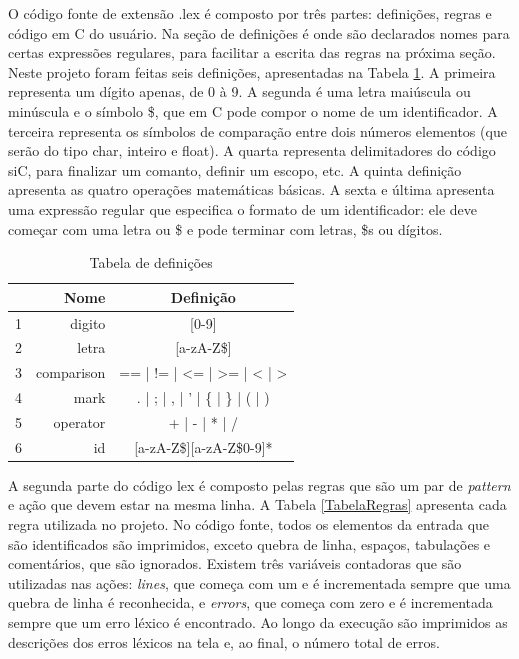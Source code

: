 \documentclass[12pt]{article}
\begin{document}
\indent O código fonte de extensão .lex é composto por três partes: definições, regras e código em C do usuário. Na seção de definições é onde são declarados nomes para certas expressões regulares, para facilitar a escrita das regras na próxima seção. Neste projeto foram feitas seis definições, apresentadas na Tabela \ref{TabelaDef}. A primeira representa um dígito apenas, de 0 à 9. A segunda é uma letra maiúscula ou minúscula e o símbolo \$, que em C pode compor o nome de um identificador. A terceira representa os símbolos de comparação entre dois números elementos (que serão do tipo char, inteiro e float). A quarta representa delimitadores do código siC, para finalizar um comanto, definir um escopo, etc. A quinta definição apresenta as quatro operações matemáticas básicas. A sexta e última apresenta uma expressão regular que especifica o formato de um identificador: ele deve começar com uma letra ou \$ e pode terminar com letras, \$s ou dígitos.

\begin{table}
 \centering
 \begin{tabular}{| c || r  c |}
  \hline
   & Nome & Definição \\
  \hline  \hline
  1 & digito & [0-9] \\
  \hline
  2 & letra & [a-zA-Z\$] \\
  \hline
  3 & comparison & == | != | <= | >= | < | > \\
  \hline
  4 & mark & . | ; | , | ' | \{ | \} | ( | ) \\
  \hline
  5 & operator & + | - | * | / \\
  \hline
  6 & id & [a-zA-Z\$][a-zA-Z\$0-9]* \\
  \hline
\end{tabular}
\caption{Tabela de definições}
\label{TabelaDef}
\end{table}
 
\indent A segunda parte do código lex é composto pelas regras que são um par de \textit{pattern} e ação que devem estar na mesma linha. A Tabela \ref{TabelaRegras} apresenta cada regra utilizada no projeto. No código fonte, todos os elementos da entrada que são identificados são imprimidos, exceto quebra de linha, espaços, tabulações e comentários, que são ignorados. Existem três variáveis contadoras que são utilizadas nas ações: \textit{lines}, que começa com um e é incrementada sempre que uma quebra de linha é reconhecida, e \textit{errors}, que começa com zero e é incrementada sempre que um erro léxico é encontrado. Ao longo da execução são imprimidos as descrições dos erros léxicos na tela e, ao final, o número total de erros.
\end{document}
